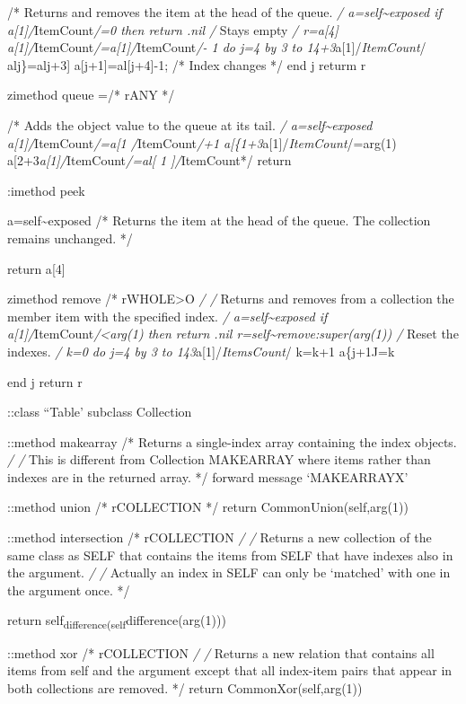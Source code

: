 /* Returns and removes the item at the head of the queue. \emph{/
a=self\textasciitilde exposed if a{[}1{]}/}ItemCount\emph{/=0 then
return .nil /} Stays empty \emph{/ r=a{[}4{]}
a{[}1{]}/}ItemCount\emph{/=a{[}1{]}/}ItemCount\emph{/- 1 do j=4 by 3 to
14+3}a{[}1{]}/\emph{ItemCount}/ alj\}=alj+3{]} a{[}j+1{]}=al{[}j+4{]}-1;
/* Index changes */ end j returm r

zimethod queue =/* rANY */

/* Adds the object value to the queue at its tail. \emph{/
a=self\textasciitilde exposed a{[}1{]}/}ItemCount\emph{/=a{[}1
\textbar/}ItemCount\emph{/+1
a{[}\{1+3}a{[}1{]}/\emph{ItemCount}/\textbar=arg(1)
a{[}2+3\emph{a{[}1{]}/}ItemCount\emph{/\textbar=al{[} 1 {]}/}ItemCount*/
return

:imethod peek

a=self\textasciitilde exposed /* Returns the item at the head of the
queue. The collection remains unchanged. */

return a{[}4{]}

zimethod remove /* rWHOLE\textgreater O \emph{/ /} Returns and removes
from a collection the member item with the specified index. \emph{/
a=self\textasciitilde exposed if
a{[}1{]}/}ItemCount\emph{/\textless arg(1) then return .nil
r=self\textasciitilde remove:super(arg(1)) /} Reset the indexes. \emph{/
k=0 do j=4 by 3 to 143}a{[}1{]}/\emph{ItemsCount}/ k=k+1 a\{j+1J=k

end j return r

::class ``Table' subclass Collection

::method makearray /* Returns a single-index array containing the index
objects. \emph{/ /} This is different from Collection MAKEARRAY where
items rather than indexes are in the returned array. */ forward message
`MAKEARRAYX'

::method union /* rCOLLECTION */ return CommonUnion(self,arg(1))

::method intersection /* rCOLLECTION \emph{/ /} Returns a new collection
of the same class as SELF that contains the items from SELF that have
indexes also in the argument. \emph{/ /} Actually an index in SELF can
only be `matched' with one in the argument once. */

return self\textsubscript{difference(self}difference(arg(1)))

::method xor /* rCOLLECTION \emph{/ /} Returns a new relation that
contains all items from self and the argument except that all index-item
pairs that appear in both collections are removed. */ return
CommonXor(self,arg(1))

